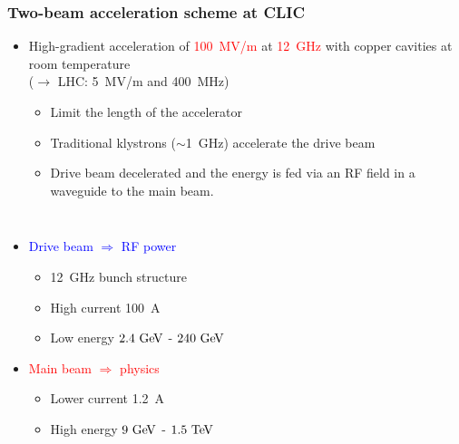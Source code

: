 {
  \begin{frame}
    \frametitle{Two-beam acceleration scheme at CLIC}
    
    \vspace{-1cm}
    \begin{itemize}
    \item High-gradient acceleration of \textcolor{Red}{100~MV/m} at
      \textcolor{Red}{12~GHz} with copper cavities at room temperature\\
      ($\rightarrow$ LHC: 5~MV/m and 400~MHz)
      \begin{itemize}
      \item Limit the length of the accelerator
      \item Traditional klystrons ($\sim$1~GHz) accelerate the drive
        beam 
      \item Drive beam decelerated and the energy is fed via an RF
        field in a waveguide to the main beam.
      \end{itemize}
    \end{itemize}
    
    \vspace{-0.3cm}
    \begin{columns}
      \begin{itemize}
      \item \textcolor{blue}{Drive beam $\Rightarrow$ RF power}
        \begin{itemize}
        \item 12~GHz bunch structure
        \item High current 100~A
        \item Low energy $2.4\,\mathrm{\,Ge\kern -0.1em V}$ - $240\,\mathrm{\,Ge\kern -0.1em V}$
        \end{itemize}
      \item \textcolor{red}{Main beam $\Rightarrow$ physics}
        \begin{itemize}
        \item Lower current 1.2~A
        \item High energy $9\,\mathrm{\,Ge\kern -0.1em V}$ - $1.5\,\mathrm{\,Te\kern -0.1em V}$
        \end{itemize}
      \end{itemize}
    \end{columns}

  \end{frame}
}

